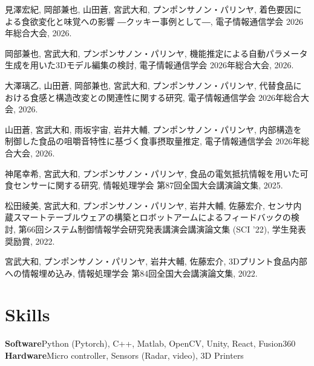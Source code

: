 \documentclass[10pt,a4paper]{article}
\newcommand{\pubheading}[1]{\vspace{3pt}{\bfseries\sffamily\small #1}\vspace{-3pt}}
\begin{document}
\pubheading{JAPANESE PAPERS}
\begin{publist}[resume]
\item 見澤宏紀, 岡部兼也, 山田蒼, 宮武大和, プンポンサノン・パリンヤ, 着色要因による食欲変化と味覚への影響 ―クッキー事例として―, 電子情報通信学会 2026年総合大会, 2026.
\item 岡部兼也, 宮武大和, プンポンサノン・パリンヤ, 機能推定による自動パラメータ生成を用いた3Dモデル編集の検討, 電子情報通信学会 2026年総合大会, 2026.
\item 大澤璃乙, 山田蒼, 岡部兼也, 宮武大和, プンポンサノン・パリンヤ, 代替食品における食感と構造改変との関連性に関する研究, 電子情報通信学会 2026年総合大会, 2026.
\item 山田蒼, 宮武大和, 雨坂宇宙, 岩井大輔, プンポンサノン・パリンヤ, 内部構造を制御した食品の咀嚼音特性に基づく食事摂取量推定, 電子情報通信学会 2026年総合大会, 2026.
\item 神尾幸希, 宮武大和, プンポンサノン・パリンヤ, 食品の電気抵抗情報を用いた可食センサーに関する研究, 情報処理学会 第87回全国大会講演論文集, 2025.
\item 松田綾美, 宮武大和, プンポンサノン・パリンヤ, 岩井大輔, 佐藤宏介, センサ内蔵スマートテーブルウェアの構築とロボットアームによるフィードバックの検討, 第66回システム制御情報学会研究発表講演会講演論文集 (SCI '22), 学生発表奨励賞, 2022.
\item 宮武大和, プンポンサノン・パリンヤ, 岩井大輔, 佐藤宏介, 3Dプリント食品内部への情報埋め込み, 情報処理学会 第84回全国大会講演論文集, 2022.
\end{publist}

\section*{Skills}
\textbf{Software}\quad Python (Pytorch), C++, Matlab, OpenCV, Unity, React, Fusion360\\
\textbf{Hardware}\quad Micro controller, Sensors (Radar, video), 3D Printers
\end{document}
